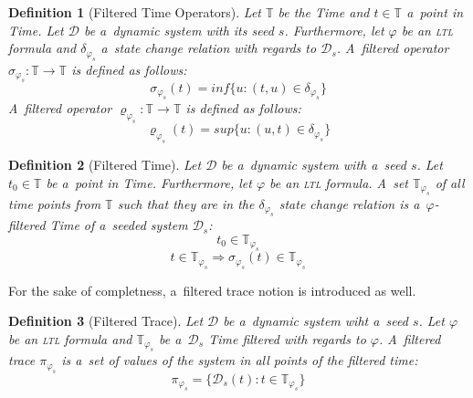 \documentclass[12pt,oneside,draft]{fithesis}
\newcommand{\mD}{\mathcal{D}}
\newcommand{\mTime}{\mathbb{T}}
\newtheorem{mydef}{Definition}
\begin{document}
\begin{mydef}[Filtered Time Operators]
Let $\mTime$ be the Time and $t\in\mTime$ a~point in Time.
Let $\mD$ be a~dynamic system with its seed $s$.
Furthermore, let $\varphi$ be an \textsc{ltl} formula and
$\delta_{\varphi_s}$ a~state change relation with regards to $\mD_s$.
A~filtered operator $\sigma_{\varphi_s}:\mTime\rightarrow\mTime$ is defined
as follows:
	\begin{equation}
		\sigma_{\varphi_s}(t) = inf\{u:(t,u)\in\delta_{\varphi_s}\}
	\end{equation}
A~filtered operator $\varrho_{\varphi_s}:\mTime\rightarrow\mTime$ is defined
as follows:
	\begin{equation}
		\varrho_{\varphi_s}(t) = sup\{u:(u,t)\in\delta_{\varphi_s}\}
	\end{equation}
\end{mydef}

\begin{mydef}[Filtered Time]
Let $\mD$ be a~dynamic system with a~seed $s$. Let $t_0\in\mTime$
be a~point in Time. Furthermore, let $\varphi$ be an \textsc{ltl}
formula. A~set $\mTime_{\varphi_s}$ of all time points from $\mTime$ such
that they are in the $\delta_{\varphi_s}$ state change relation is
a~$\varphi$-filtered Time of a~seeded system $\mD_s$:
$$t_0\in\mTime_{\varphi_s}$$
$$t\in\mTime_{\varphi_s}\Rightarrow\sigma_{\varphi_s}(t)\in\mTime_{\varphi_s}$$
\end{mydef}

For the sake of completness, a~filtered trace notion is introduced as
well.
\begin{mydef}[Filtered Trace]
Let $\mD$ be a~dynamic system wiht a~seed $s$. Let $\varphi$ be an
\textsc{ltl} formula and $\mTime_{\varphi_s}$ be a~$\mD_s$ Time filtered
with regards to $\varphi$. A~filtered trace $\pi_{\varphi_s}$ is a~set of
values of the system in all points of the filtered time:
	\begin{equation}
		\pi_{\varphi_s}=\{\mD_s(t):t\in\mTime_{\varphi_s}\}
	\end{equation}
\end{mydef}
%

%
%
\end{document}
